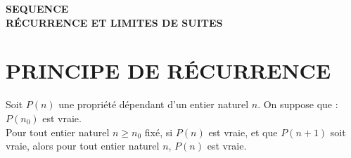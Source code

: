 \documentclass[11pt,twoside, openany]{extbook}
\begin{document}
\tableofcontents 
\newpage
\myemptypage
        \begin{tcolorbox}[    %
        lifted shadow={1mm}{-3mm}{5mm}{0.1mm}%
        {black!50!white}]
 \begin{center}
 {\textbf{\LARGE SEQUENCE  \vspace{0.2cm}\\ \LARGE RÉCURRENCE ET LIMITES DE SUITES}}
 \end{center}
        \end{tcolorbox}
        \vskip0.5cm

\section{PRINCIPE DE RÉCURRENCE}
	\begin{trm}
		Soit $P(n)$ une propriété dépendant d'un entier naturel $n$. On suppose que : $P(n_0)$ est vraie.\\
        Pour tout entier naturel $n \ge n_0$ fixé, si $P(n)$ est vraie, et que $P(n+1)$ soit vraie, alors pour tout entier naturel $n$, $P(n)$ est vraie.
	\end{trm}

\medskip
\end{document}

